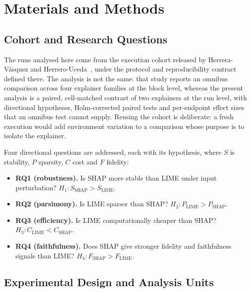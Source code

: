 \documentclass{cleiej}
\begin{document}
\section{Materials and Methods}
\label{sec:methods}

\subsection{Cohort and Research Questions}
\label{sec:rqs}

The runs analysed here come from the execution cohort released by
Herrera-V\'asquez and Herrero-Uceda~\cite{herrera2026framework}, under the
protocol and reproducibility contract defined there. The analysis is not
the same: that study reports an omnibus comparison across four explainer
families at the block level, whereas the present analysis is a paired,
cell-matched contrast of two explainers at the run level, with directional
hypotheses, Holm-corrected paired tests and per-endpoint effect sizes that
an omnibus test cannot supply. Reusing the cohort is deliberate: a fresh
execution would add environment variation to a comparison whose purpose is
to isolate the explainer.

Four directional questions are addressed, each with its hypothesis, where
$S$ is stability, $P$ sparsity, $C$ cost and $F$ fidelity:
\begin{itemize}
\item \textbf{RQ1 (robustness).} Is SHAP more stable than LIME under input
perturbation? $H_1: S_{\mathrm{SHAP}} > S_{\mathrm{LIME}}$.
\item \textbf{RQ2 (parsimony).} Is LIME sparser than SHAP?
$H_2: P_{\mathrm{LIME}} > P_{\mathrm{SHAP}}$.
\item \textbf{RQ3 (efficiency).} Is LIME computationally cheaper than SHAP?
$H_3: C_{\mathrm{LIME}} < C_{\mathrm{SHAP}}$.
\item \textbf{RQ4 (faithfulness).} Does SHAP give stronger fidelity and
faithfulness signals than LIME? $H_4: F_{\mathrm{SHAP}} > F_{\mathrm{LIME}}$.
\end{itemize}

\subsection{Experimental Design and Analysis Units}
\label{sec:design}
\end{document}
